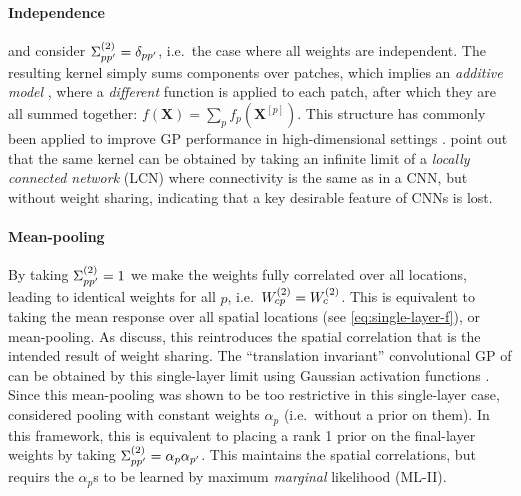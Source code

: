 \documentclass[tablecaption=bottom,wcp,nonatbib]{jmlr} %
\newcommand{\vX}{\mathbf{X}}
\begin{document}
\paragraph{Independence} \citet{garriga2018infiniteconv} and \citet{novak2019infiniteconv} consider $\Sigma^{(2)}_{pp'} = \delta_{pp'}$, i.e.~the case where all weights are independent. The resulting kernel simply sums components over patches, which implies an \emph{additive model} \citep{stone1985}, where a \emph{different} function is applied to each patch, after which they are all summed together: $f(\vX) = \sum_p f_p(\vX^{[p]})$. This structure has commonly been applied to improve GP performance in high-dimensional settings \citep[e.g.][]{duvenaud2011additive,durrande2012additive}. \citet{novak2019infiniteconv} point out that the same kernel can be obtained by taking an infinite limit of a \emph{locally connected network} (LCN) \citep{lecun1989generalization} where connectivity is the same as in a CNN, but without weight sharing, indicating that a key desirable feature of CNNs is lost.

\paragraph{Mean-pooling} By taking $\Sigma^{(2)}_{pp'} = 1$ we make the weights fully correlated over all locations, leading to identical weights for all $p$, i.e.~$W^{(2)}_{cp} = W^{(2)}_{c}$. This is equivalent to taking the mean response over all spatial locations (see \cref{eq:single-layer-f}), or mean-pooling. As \citet{novak2019infiniteconv} discuss, this reintroduces the spatial correlation that is the intended result of weight sharing. The ``translation invariant'' convolutional GP of  can be obtained by this single-layer limit using Gaussian activation functions \citep{vdw2019thesis}. Since this mean-pooling was shown to be too restrictive in this single-layer case,  considered pooling with constant weights $\alpha_p$ (i.e.~without a prior on them). In this framework, this is equivalent to placing a rank 1 prior on the final-layer weights by taking $\Sigma^{(2)}_{pp'} = \alpha_p \alpha_{p'}$. This maintains the spatial correlations, but requirs the $\alpha_p$s to be learned by maximum \textit{marginal} likelihood (ML-II).

\end{document}
